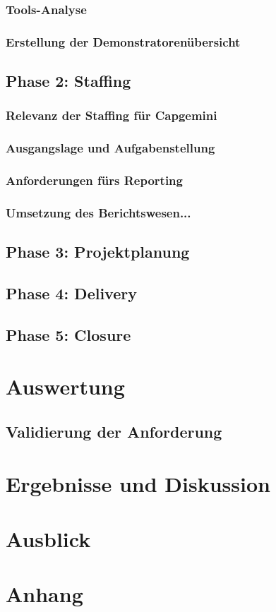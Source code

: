 \documentclass[a4paper, 12pt]{scrartcl}
\begin{document}
	\subsubsection{Tools-Analyse}%
	\subsubsection{Erstellung der Demonstratorenübersicht}
	\newpage
	\subsection{Phase 2: Staffing}
	\subsubsection{Relevanz der Staffing für Capgemini}%
	\subsubsection{Ausgangslage und Aufgabenstellung}
	\subsubsection{Anforderungen fürs Reporting}
	\subsubsection{Umsetzung des Berichtswesen...}
	\newpage
	\subsection{Phase 3: Projektplanung}
	\newpage
	\subsection{Phase 4: Delivery}
	\newpage
	\subsection{Phase 5: Closure}
	\newpage
	\section{Auswertung}
	\subsection{Validierung der Anforderung}%
	\newpage
	\section{Ergebnisse und Diskussion}
		\newpage
	\section{Ausblick}

		\newpage
	\section{Anhang}
	
\end{document}

